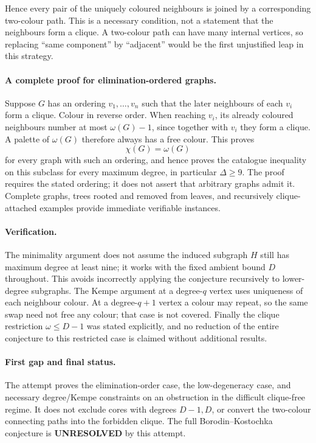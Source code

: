 \documentclass[11pt,a4paper]{article}
\begin{document}
Hence every pair of the uniquely coloured neighbours is joined by a corresponding two-colour path. This is a necessary condition, not a statement that the neighbours form a clique. A two-colour path can have many internal vertices, so replacing ``same component'' by ``adjacent'' would be the first unjustified leap in this strategy.

\paragraph{A complete proof for elimination-ordered graphs.}
Suppose $G$ has an ordering $v_1,\ldots,v_n$ such that the later neighbours of each $v_i$ form a clique. Colour in reverse order. When reaching $v_i$, its already coloured neighbours number at most $\omega(G)-1$, since together with $v_i$ they form a clique. A palette of $\omega(G)$ therefore always has a free colour. This proves
\[
 \chi(G)=\omega(G)
\]
for every graph with such an ordering, and hence proves the catalogue inequality on this subclass for every maximum degree, in particular $\Delta\ge9$. The proof requires the stated ordering; it does not assert that arbitrary graphs admit it. Complete graphs, trees rooted and removed from leaves, and recursively clique-attached examples provide immediate verifiable instances.

\paragraph{Verification.}
The minimality argument does not assume the induced subgraph $H$ still has maximum degree at least nine; it works with the fixed ambient bound $D$ throughout. This avoids incorrectly applying the conjecture recursively to lower-degree subgraphs. The Kempe argument at a degree-$q$ vertex uses uniqueness of each neighbour colour. At a degree-$q+1$ vertex a colour may repeat, so the same swap need not free any colour; that case is not covered. Finally the clique restriction $\omega\le D-1$ was stated explicitly, and no reduction of the entire conjecture to this restricted case is claimed without additional results.

\paragraph{First gap and final status.}
The attempt proves the elimination-order case, the low-degeneracy case, and necessary degree/Kempe constraints on an obstruction in the difficult clique-free regime. It does not exclude cores with degrees $D-1,D$, or convert the two-colour connecting paths into the forbidden clique. The full Borodin--Kostochka conjecture is \textbf{UNRESOLVED} by this attempt.
\end{document}
